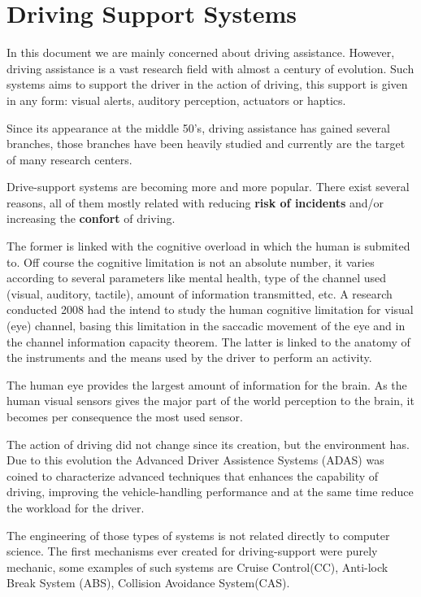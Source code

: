 \section{Driving Support Systems}

In this document we are mainly concerned about driving assistance. However, driving assistance is a vast research field with almost a century of evolution. Such systems aims to support the driver in the action of driving, this support is given in any form: visual alerts, auditory perception, actuators or haptics\cite{riener2010sensor}.

Since its appearance at the middle 50's, driving assistance has gained several branches, those branches have been heavily studied and currently are the target of many research centers.

Drive-support systems are becoming more and more popular. There exist several reasons, all of them mostly related with reducing \textbf{risk of incidents} and/or increasing the \textbf{confort} of driving. 

The former is linked with the cognitive overload in which the human is submited to. Off course the cognitive limitation is not an absolute number, it varies according to several parameters like mental health, type of the channel used (visual, auditory, tactile), amount of information transmitted, etc. A research conducted 2008 had the intend to study the human cognitive limitation for visual (eye) channel, basing this limitation in the saccadic movement of the eye and in the channel information capacity theorem\cite{LautarutisV}. The latter is linked to the anatomy of the instruments and the means used by the driver to perform an activity.

The human eye provides the largest amount of information for the brain. As the human visual sensors gives the major part of the world perception to the brain, it becomes per consequence the most used sensor.

The action of driving did not change since its creation, but the environment has. Due to this evolution the Advanced Driver Assistence Systems (ADAS) was coined to characterize advanced techniques that enhances the capability of driving, improving the vehicle-handling performance and at the same time reduce the workload for the driver\cite{riener2010sensor}.

The engineering of those types of systems is not related directly to computer science. The first mechanisms ever created for driving-support were purely mechanic, some examples of such systems are Cruise Control(CC), Anti-lock Break System (ABS), Collision Avoidance System(CAS).

